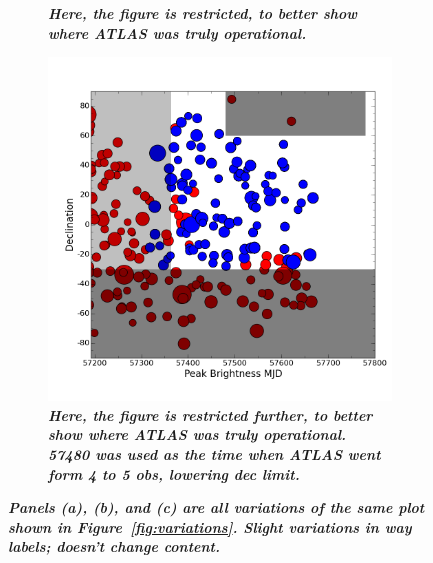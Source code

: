 \begin{figure}
\begin{subfigure}{.5\textwidth}
		\caption{\it \small{{\bf Here, the figure is restricted, to better show where ATLAS was truly operational.}}}
		\label{fig:var6}
	\end{subfigure}
	\begin{subfigure}{.5\textwidth}
	  \centering
			\includegraphics[width=1\linewidth]{figures/variations/plot2useinPaper_restrictxfurther.png}
		\caption{\it \small{{\bf Here, the figure is restricted further, to better show where ATLAS was truly operational. 57480 was used as the time when ATLAS went form 4 to 5 obs, lowering dec limit.}}}
		\label{fig:var7}
	\end{subfigure}%
	\caption{\it \small{{\bf Panels (a), (b), and (c) are all variations of the same plot shown in Figure~\ref{fig:variations}. Slight variations in way labels; doesn't change content.}}}
	\label{fig:variations2}
\end{figure}



